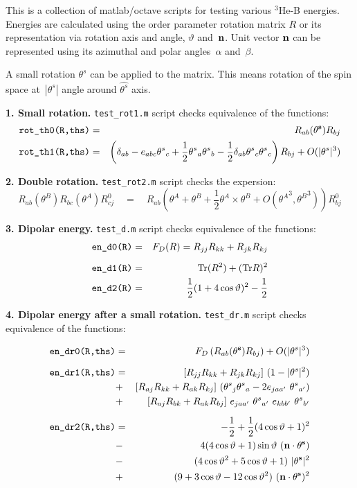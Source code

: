 \documentclass[a4paper]{article}
\def\ts{{\theta^s}}
\def\ta{{\theta^A}}
\def\tb{{\theta^B}}
\def\ct{\cos\vartheta}
\def\st{\sin\vartheta}
\begin{document}
This is a collection of matlab/octave scripts for testing various $^3$He-B
energies. Energies are calculated using the order parameter rotation matrix $R$ or its
representation via rotation axis and angle, $\vartheta$ and~$\bf n$. Unit vector $\bf n$
can be represented using its azimuthal and polar angles~$\alpha$ and~$\beta$.

A small rotation $\ts$ can be applied to the matrix. This means rotation of the spin space
at~$|\ts|$ angle around $\hat\ts$ axis.

{\bf 1. Small rotation.}
{\tt test\_rot1.m} script checks equivalence of the functions:
\begin{eqnarray*}
\mbox{\tt rot\_th0(R,ths)} &=& R_{ab}({\bf \ts}) R_{bj}\\
\mbox{\tt rot\_th1(R,ths)} &=& 
\left(\delta_{ab} - e_{abc}\ts_c + \frac12 \ts_a \ts_b
 - \frac12 \delta_{ab}\ts_c \ts_c
\right) R_{bj} + O(|\ts|^3)
\end{eqnarray*}

{\bf 2. Double rotation.}
{\tt test\_rot2.m} script checks the expersion:
$$
R_{ab}(\tb)R_{bc}(\ta) R^0_{cj} \quad=\quad
R_{ab}\left(\ta + \tb + \frac12 \ta\times\tb + O(\ta^3,\tb^3)\right) R^0_{bj}
$$

{\bf 3. Dipolar energy.}
{\tt test\_d.m} script checks equivalence of the functions:
\begin{eqnarray*}
\mbox{\tt en\_d0(R)} &=& F_D(R) = R_{jj}R_{kk} + R_{jk}R_{kj}\\[2mm]
\mbox{\tt en\_d1(R)} &=& \mbox{Tr} (R^2) + (\mbox{Tr} R)^2\\
\mbox{\tt en\_d2(R)} &=& \frac12 (1 + 4\ct)^2 - \frac12
\end{eqnarray*}

{\bf 4. Dipolar energy after a small rotation.}
{\tt test\_dr.m} script checks equivalence of the functions:

\begin{eqnarray*}
\mbox{\tt en\_dr0(R,ths)} &=&
F_D\left(R_{ab}({\bf \ts}) R_{bj}\right) + O(|\ts|^3)\\[2mm]
\mbox{\tt en\_dr1(R,ths)} &=&
[ R_{jj} R_{kk} + R_{jk}R_{kj} ]\ (1-|\ts|^2)\\
&+& [R_{aj} R_{kk} + R_{ak} R_{kj}]\ (\ts_j \ts_a - 2e_{ja a'}\ \ts_{a'}) \\
&+& [R_{aj} R_{bk} + R_{ak} R_{bj}]\ e_{jaa'}\ \ts_{a'}\ e_{kbb'}\ \ts_{b'}
\\[2mm]
\mbox{\tt en\_dr2(R,ths)} &=&
 - \frac12 + \frac12 (4\ct+1)^2\\
 &-& 4(4\ct+1)\st\ ({\bf n}\cdot{\bf\ts})\\
 &-& (4\ct^2+5\ct+1)\ |{\bf\ts}|^2\\
 &+& (9 + 3\ct - 12\ct^2)\ ({\bf n}\cdot{\bf\ts})^2
\end{eqnarray*}
\end{document}
